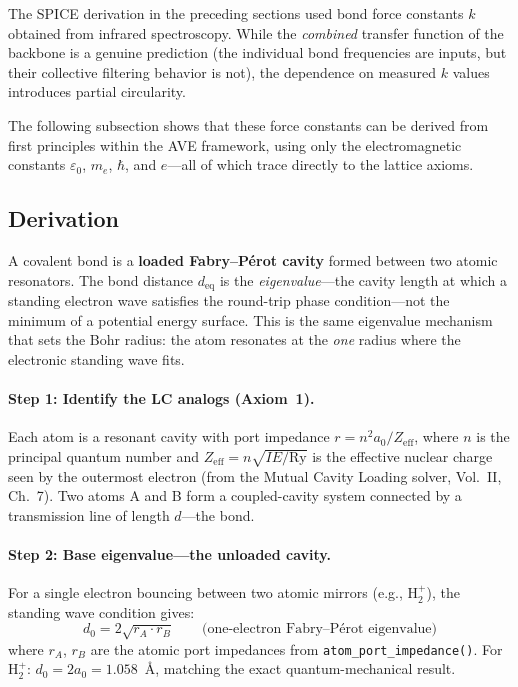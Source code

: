 The SPICE derivation in the preceding sections used bond force constants $k$ obtained from infrared spectroscopy. While the \emph{combined} transfer function of the backbone is a genuine prediction (the individual bond frequencies are inputs, but their collective filtering behavior is not), the dependence on measured $k$ values introduces partial circularity.

The following subsection shows that these force constants can be derived from first principles within the AVE framework, using only the electromagnetic constants $\varepsilon_0$, $m_e$, $\hbar$, and $e$---all of which trace directly to the lattice axioms.

\subsection{Derivation}

A covalent bond is a \textbf{loaded Fabry--P\'{e}rot cavity} formed between two atomic resonators. The bond distance $d_\text{eq}$ is the \emph{eigenvalue}---the cavity length at which a standing electron wave satisfies the round-trip phase condition---not the minimum of a potential energy surface. This is the same eigenvalue mechanism that sets the Bohr radius: the atom resonates at the \emph{one} radius where the electronic standing wave fits.

\paragraph{Step 1: Identify the LC analogs (Axiom~1).}
Each atom is a resonant cavity with port impedance $r = n^2 a_0 / Z_\text{eff}$, where $n$ is the principal quantum number and $Z_\text{eff} = n \sqrt{IE/\text{Ry}}$ is the effective nuclear charge seen by the outermost electron (from the Mutual Cavity Loading solver, Vol.~II, Ch.~7). Two atoms A and B form a coupled-cavity system connected by a transmission line of length $d$---the bond.

\paragraph{Step 2: Base eigenvalue---the unloaded cavity.}
For a single electron bouncing between two atomic mirrors (e.g., H$_2^+$), the standing wave condition gives:
\begin{equation}
    d_0 = 2\sqrt{r_A \cdot r_B}
    \qquad \text{(one-electron Fabry--P\'{e}rot eigenvalue)}
    \label{eq:fp_one_electron}
\end{equation}
where $r_A$, $r_B$ are the atomic port impedances from \texttt{atom\_port\_impedance()}. For H$_2^+$: $d_0 = 2a_0 = 1.058$~\AA, matching the exact quantum-mechanical result.

